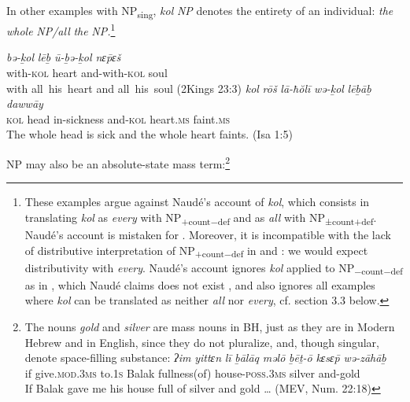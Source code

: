 \documentclass[output=paper]{langsci/langscibook}
\begin{document}
In other examples with NP\textsubscript{sing}, \textit{kol} \textit{NP} denotes the entirety of an individual: \textit{the} \textit{whole} \textit{NP/all} \textit{the} \textit{NP.}\footnote{These examples argue against Naudé’s \citeyearpar{Naudé2011interpretation} account of \textit{kol}, which consists in translating \textit{kol} as \textit{every} with NP\textsubscript{+count$-$def} and as \textit{all} with NP\textsubscript{±count+def}. Naudé’s account is mistaken for . Moreover, it is incompatible with the lack of distributive interpretation of NP\textsubscript{+count$-$def} in  and : we would expect distributivity with \textit{every}. Naudé’s account ignores \textit{kol} applied to NP\textsubscript{$-$count$-$def} as in , which Naudé claims does not exist \citeyearpar[418]{Naudé2011interpretation}, and also ignores all examples where \textit{kol} can be translated as neither \textit{all} nor \textit{every}, cf. section 3.3 below.}

\ea%
    \label{ex:doron:17}
    \ea
    \gll \textit{bə-ḵol}       \textit{lēḇ}      \textit{ū-ḇə{}-ḵol           nɛ\={p}ɛš} \\
         with-\textsc{kol} heart  and-with-\textsc{kol}  soul        \\
    \glt with all~his~heart and all~his~soul (2Kings 23:3)
    \ex
    \gll \textit{kol}    \textit{rōš}     \textit{lā-ħŏlī}        \textit{wə-ḵol}     \textit{lēḇāḇ}        \textit{dawwāy}\\
         \textsc{kol} head  in-sickness  and-\textsc{kol} heart.\textsc{ms}  faint.\textsc{ms}\\
    \glt The whole head is sick and the whole heart faints. (Isa 1:5)
    \z
\z

NP may also be an absolute-state mass term:\footnote{The nouns \textit{gold} and \textit{silver} are mass nouns in BH, just as they are in Modern Hebrew and in English, since they do not pluralize, and, though singular, denote space-filling substance:
\ea
    \gll \textit{ʔim} \textit{yittɛn}                \textit{lī}      \textit{ḇālāq} \textit{məlō}             \textit{ḇēṯ-ō}                    \textit{kɛsɛ}\textrm{\textit{\={p}}} \textit{wə-zāhāḇ}\\
            if    give.\textsc{mod.3ms} to.\textsc{1s} Balak fullness(of)  house-\textrm{\textsc{poss.3ms}}  silver and-gold \\
    \glt If Balak gave me his house full of silver and gold … (MEV, Num. 22:18)
\z}
\end{document}
